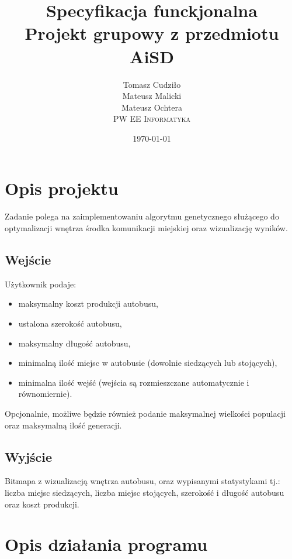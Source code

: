 \documentclass[10pt,a4paper]{article}
\begin{document}
\title{Specyfikacja funckjonalna\\
  Projekt grupowy z przedmiotu AiSD
}
\author{
  Tomasz Cudziło\\
  Mateusz Malicki\\
  Mateusz Ochtera\\
  \textsc{PW EE Informatyka}\\[10pt]
}
\date{\today}
\maketitle



\section{Opis projektu}

Zadanie polega na zaimplementowaniu algorytmu genetycznego służącego do
optymalizacji wnętrza środka komunikacji miejskiej oraz wizualizację wyników.


\subsection{Wejście}
Użytkownik podaje:
\begin{itemize}
  \item maksymalny koszt produkcji autobusu,
  \item ustalona szerokość autobusu,
  \item maksymalny długość autobusu,
  \item minimalną ilość miejsc w autobusie (dowolnie siedzących lub stojących),
  \item minimalna ilość wejść (wejścia są rozmieszczane automatycznie i
    równomiernie).
\end{itemize}
Opcjonalnie, możliwe będzie również podanie maksymalnej wielkości populacji oraz
maksymalną ilość generacji.


\subsection{Wyjście}
Bitmapa z wizualizacją wnętrza autobusu, oraz wypisanymi statystykami tj.:
liczba miejsc siedzących, liczba miejsc stojących, szerokość i długość autobusu
oraz koszt produkcji.



\section{Opis działania programu}
\end{document}

